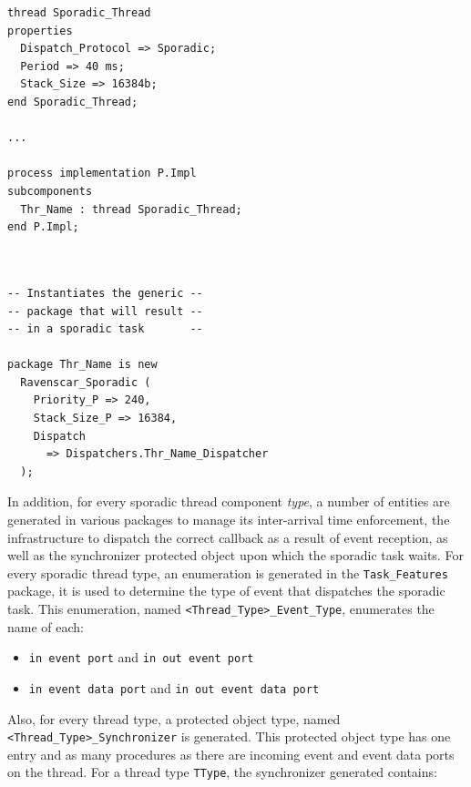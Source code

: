 \begin{minipage}{0.45\linewidth}
\lstset{language=aadl}
\begin{lstlisting}[label=lst:sporadic_aadl, caption=AADL sporadic
    thread]
thread Sporadic_Thread
properties
  Dispatch_Protocol => Sporadic;
  Period => 40 ms;
  Stack_Size => 16384b;
end Sporadic_Thread;

...

process implementation P.Impl
subcomponents
  Thr_Name : thread Sporadic_Thread;
end P.Impl;
\end{lstlisting}
\end{minipage}
\hspace{5mm}
\begin{minipage}{0.45\linewidth}
\lstset{language=ada}
\begin{lstlisting}[label=lst:sporadic_instantiation, caption=Thread transformed to Ada task]


-- Instantiates the generic --
-- package that will result --
-- in a sporadic task       --

package Thr_Name is new
  Ravenscar_Sporadic (
    Priority_P => 240, 
    Stack_Size_P => 16384,
    Dispatch
      => Dispatchers.Thr_Name_Dispatcher
  );
\end{lstlisting}
\end{minipage}

In addition, for every sporadic thread component \emph{type}, a
number of entities are generated in various packages to manage its
inter-arrival time enforcement, the infrastructure to dispatch the
correct callback as a result of event reception, as well as the
synchronizer protected object upon which the sporadic task waits. For
every sporadic thread type, an enumeration is generated in the
\texttt{Task\_Features} package, it is used to determine the type of
event that dispatches the sporadic task. This enumeration, named
\texttt{<Thread\_Type>\_Event\_Type}, enumerates the name of each:

\begin{itemize}
\item{\texttt{in event port} and \texttt{in out event port}}
\item{\texttt{in event data port} and \texttt{in out event data port}}
\end{itemize}

Also, for every thread type, a protected object type, named
\texttt{<Thread\_Type>\_Synchronizer} is generated. This protected
object type has one entry and as many procedures as there are incoming
event and event data ports on the thread. For a thread type
\texttt{TType}, the synchronizer generated contains:

